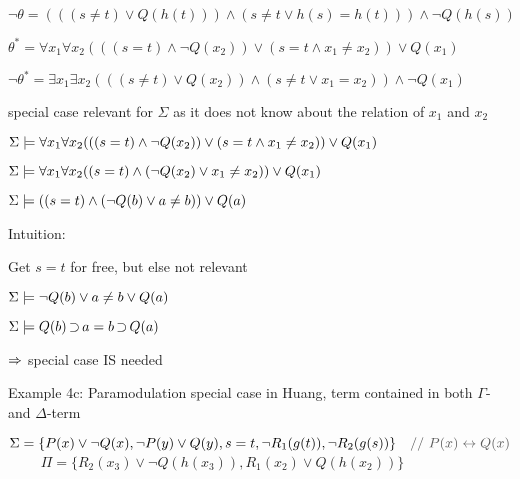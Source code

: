 \documentclass[,%
			paper=25cm:30cm,%
			DIV22,
			liststotoc,
			bibtotoc,
			draft=false,%
			numbers=noendperiod
			]{scrartcl}
\theoremstyle{definition}
\begin{document}
$\lnot \theta = (((s\neq t) \lor Q(h(t))) \land (s\neq t \lor h(s) = h(t))) \land \lnot Q(h(s))  $

$\theta^* = \forall x_1 \forall x_2 (((s=t) \land \lnot Q(x_2)) \lor (s=t \land x_1 \neq x_2)) \lor Q(x_1)  $

$\lnot \theta^* = \exists x_1 \exists x_2 (((s\neq t) \lor Q(x_2)) \land (s\neq t \lor x_1 = x_2)) \land \lnot Q(x_1)  $
\bigskip

special case relevant for $\Sigma$ as it does not know about the relation of $x_1$ and $x_2$

$\Sigma \entails \forall x_1 \forall x_2 (((s=t) \land \lnot Q(x_2)) \lor (s=t \land x_1 \neq x_2)) \lor Q(x_1)  $


$\Sigma \entails \forall x_1 \forall x_2 ((s=t) \land (\lnot Q(x_2) \lor x_1 \neq x_2)) \lor Q(x_1)  $

$\Sigma \entails ((s=t) \land (\lnot Q(b) \lor a \neq b)) \lor Q(a)  $

Intuition: 

Get $s=t$ for free, but else not relevant

$\Sigma \entails \lnot Q(b) \lor a \neq b \lor Q(a)  $

$\Sigma \entails Q(b) \limpl a = b \limpl Q(a)  $



	{
		\Large 

	$ \Ra$ special case IS needed 
}


\clearpage

Example 4c: Paramodulation special case in Huang, term contained in both $\Gamma$- and $\Delta$-term

$\Sigma = \{ P(x) \lor \lnot Q(x), \lnot P(y) \lor Q(y), s=t, \lnot R_1(g(t)), \lnot R_2(g(s))  \}  \quad{\color{grey}//~P(x) \lra Q(x) }$ $\quad\quad$
$\Pi = \{ R_2(x_3) \lor \lnot Q(h(x_3)), R_1(x_2) \lor  Q(h(x_2)) \} $
\begin{prooftree}




\end{prooftree}
\begin{prooftree}



\end{prooftree}
\end{document}
